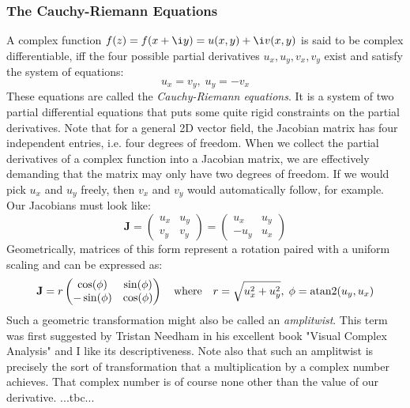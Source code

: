 \subsubsection{The Cauchy-Riemann Equations}
A complex function $f(z) = f(x + \i y) = u(x,y) + \i v(x,y)$ is said to be complex differentiable, iff the four possible partial derivatives $u_x, u_y, v_x, v_y$ exist and satisfy the system of equations:
\begin{equation}
 u_x = v_y, \; u_y = -v_x
\end{equation}
These equations are called the \emph{Cauchy-Riemann equations}. It is a system of two partial differential equations that puts some quite rigid constraints on the partial derivatives. Note that for a general 2D vector field, the Jacobian matrix has four independent entries, i.e. four degrees of freedom. When we collect the partial derivatives of a complex function into a Jacobian matrix, we are effectively demanding that the matrix may only have two degrees of freedom. If we would pick $u_x$ and $u_y$ freely, then $v_x$ and $v_y$ would automatically follow, for example. Our Jacobians must look like:
\begin{equation}
 \mathbf{J} =   \begin{pmatrix} u_x & u_y \\	 v_y & v_y \end{pmatrix}
            =   \begin{pmatrix} u_x & u_y \\	-u_y & u_x \end{pmatrix}
\end{equation}
Geometrically, matrices of this form represent a rotation paired with a uniform scaling and can be expressed as:
\begin{equation}
	 \mathbf{J} = r \begin{pmatrix}  \cos(\phi)   & \sin(\phi)   \\	
                              	 	-\sin(\phi)   & \cos(\phi)   \end{pmatrix}
	\quad \text{where}  \quad
	r = \sqrt{u_x^2 + u_y^2}, \; \phi = \atan2(u_y, u_x)
\end{equation}
Such a geometric transformation might also be called an \emph{amplitwist}. This term was first suggested by Tristan Needham in his excellent book "Visual Complex Analysis" and I like its descriptiveness. Note also that such an amplitwist is precisely the sort of transformation that a multiplication by a complex number achieves. That complex number is of course none other than the value of our derivative. ...tbc...

